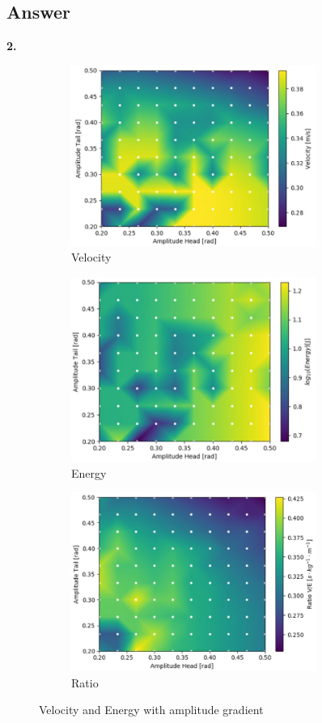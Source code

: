 \documentclass{cmc}
\begin{document}
\subsection*{Answer}

\textbf{2.} 
\begin{figure}[H]

\begin{subfigure}{0.5\textwidth}
\includegraphics[width=8cm]{9c_vel.JPG}
\caption{Velocity}
\label{fig:9c1}
\end{subfigure}
\begin{subfigure}{0.5\textwidth}
\includegraphics[width=8cm]{9c_en.JPG}
\caption{Energy}
\label{fig:9c2}
\end{subfigure}

\begin{center}
\begin{subfigure}{0.5\textwidth}
\includegraphics[width=8cm]{9c_ratio.JPG}
\caption{Ratio}
\label{fig:9c3}
\end{subfigure}    
\end{center}

 
\caption{Velocity and Energy with amplitude gradient}
\label{fig:9c}
\end{figure}
\end{document}
